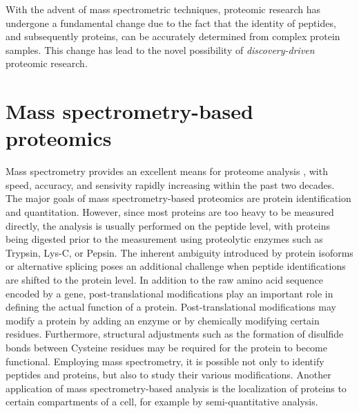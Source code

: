 With the advent of mass spectrometric techniques, proteomic research has
undergone a fundamental change due to the fact that the identity of 
peptides, and subsequently proteins, can be accurately determined from 
complex protein samples.
This change has lead to the novel possibility of {\em discovery-driven}
proteomic research.

\section{Mass spectrometry-based proteomics}

Mass spectrometry provides an excellent means for proteome analysis
\citep{Aebersold2003}, with speed, accuracy, and sensivity rapidly increasing
within the past two decades.
The major goals of mass spectrometry-based proteomics are protein 
identification and quantitation.
However, since most proteins are too heavy to be measured directly, the
analysis is usually performed on the peptide level, with proteins being digested
prior to the measurement using proteolytic enzymes such as Trypsin, Lys-C, or 
Pepsin. 
The inherent ambiguity introduced by protein isoforms or alternative splicing
poses an additional challenge when peptide identifications are shifted to
the protein level.
In addition to the raw amino acid sequence encoded by a gene, post-translational
modifications play an important role in defining the actual function of a
protein.
Post-translational modifications may modify a protein by adding an enzyme or by
chemically modifying certain residues.
Furthermore, structural adjustments such as the formation of disulfide 
bonds between Cysteine residues may be required for the protein to become 
functional.
Employing mass spectrometry, it is possible not only to identify peptides and
proteins, but also to study their various modifications.
Another application of mass spectrometry-based analysis is the localization of
proteins to certain compartments of a cell, for example by semi-quantitative
analysis.

